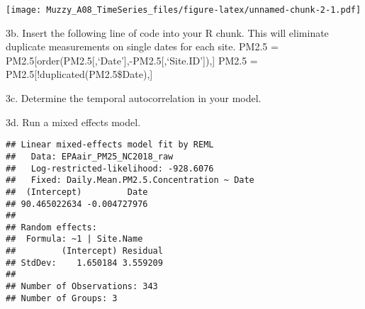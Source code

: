 \documentclass[]{article}
\newenvironment{Shaded}{\begin{snugshade}}{\end{snugshade}}
\newcommand{\KeywordTok}[1]{\textcolor[rgb]{0.13,0.29,0.53}{\textbf{#1}}}
\newcommand{\DataTypeTok}[1]{\textcolor[rgb]{0.13,0.29,0.53}{#1}}
\newcommand{\DecValTok}[1]{\textcolor[rgb]{0.00,0.00,0.81}{#1}}
\newcommand{\FloatTok}[1]{\textcolor[rgb]{0.00,0.00,0.81}{#1}}
\newcommand{\StringTok}[1]{\textcolor[rgb]{0.31,0.60,0.02}{#1}}
\newcommand{\CommentTok}[1]{\textcolor[rgb]{0.56,0.35,0.01}{\textit{#1}}}
\newcommand{\OperatorTok}[1]{\textcolor[rgb]{0.81,0.36,0.00}{\textbf{#1}}}
\newcommand{\NormalTok}[1]{#1}
\begin{document}
\begin{Shaded}
\end{Shaded}

\texttt{[image: Muzzy\_A08\_TimeSeries\_files/figure-latex/unnamed-chunk-2-1.pdf]}

3b. Insert the following line of code into your R chunk. This will
eliminate duplicate measurements on single dates for each site. PM2.5 =
PM2.5{[}order(PM2.5{[},`Date'{]},-PM2.5{[},`Site.ID'{]}),{]} PM2.5 =
PM2.5{[}!duplicated(PM2.5\$Date),{]}

3c. Determine the temporal autocorrelation in your model.

3d. Run a mixed effects model.

\begin{Shaded}
\end{Shaded}

\begin{verbatim}
## Linear mixed-effects model fit by REML
##   Data: EPAair_PM25_NC2018_raw 
##   Log-restricted-likelihood: -928.6076
##   Fixed: Daily.Mean.PM2.5.Concentration ~ Date 
##  (Intercept)         Date 
## 90.465022634 -0.004727976 
## 
## Random effects:
##  Formula: ~1 | Site.Name
##         (Intercept) Residual
## StdDev:    1.650184 3.559209
## 
## Number of Observations: 343
## Number of Groups: 3
\end{verbatim}
\end{document}
